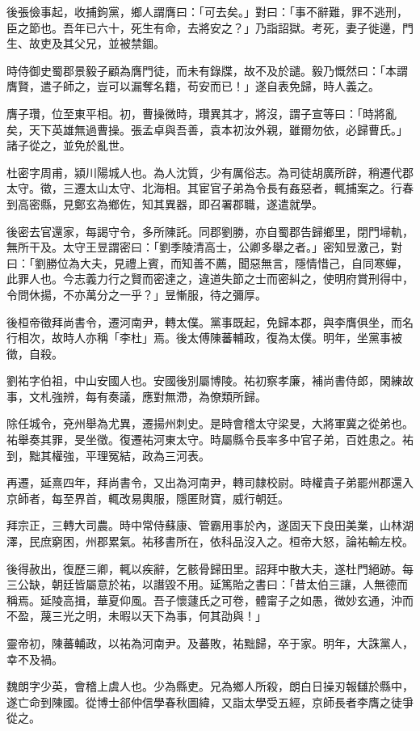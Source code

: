 \begin{pinyinscope}
後張儉事起，收捕鉤黨，鄉人謂膺曰：「可去矣。」對曰：「事不辭難，罪不逃刑，臣之節也。吾年已六十，死生有命，去將安之？」乃詣詔獄。考死，妻子徙邊，門生、故吏及其父兄，並被禁錮。

時侍御史蜀郡景毅子顧為膺門徒，而未有錄牒，故不及於譴。毅乃慨然曰：「本謂膺賢，遣子師之，豈可以漏奪名籍，苟安而已！」遂自表免歸，時人義之。

膺子瓚，位至東平相。初，曹操微時，瓚異其才，將沒，謂子宣等曰：「時將亂矣，天下英雄無過曹操。張孟卓與吾善，袁本初汝外親，雖爾勿依，必歸曹氏。」諸子從之，並免於亂世。

杜密字周甫，潁川陽城人也。為人沈質，少有厲俗志。為司徒胡廣所辟，稍遷代郡太守。徵，三遷太山太守、北海相。其宦官子弟為令長有姦惡者，輒捕案之。行春到高密縣，見鄭玄為鄉佐，知其異器，即召署郡職，遂遣就學。

後密去官還家，每謁守令，多所陳託。同郡劉勝，亦自蜀郡告歸鄉里，閉門埽軌，無所干及。太守王昱謂密曰：「劉季陵清高士，公卿多舉之者。」密知昱激己，對曰：「劉勝位為大夫，見禮上賓，而知善不薦，聞惡無言，隱情惜己，自同寒蟬，此罪人也。今志義力行之賢而密達之，違道失節之士而密糾之，使明府賞刑得中，令問休揚，不亦萬分之一乎？」昱慚服，待之彌厚。

後桓帝徵拜尚書令，遷河南尹，轉太僕。黨事既起，免歸本郡，與李膺俱坐，而名行相次，故時人亦稱「李杜」焉。後太傅陳蕃輔政，復為太僕。明年，坐黨事被徵，自殺。

劉祐字伯祖，中山安國人也。安國後別屬博陵。祐初察孝廉，補尚書侍郎，閑練故事，文札強辨，每有奏議，應對無滯，為僚類所歸。

除任城令，兗州舉為尤異，遷揚州刺史。是時會稽太守梁旻，大將軍冀之從弟也。祐舉奏其罪，旻坐徵。復遷祐河東太守。時屬縣令長率多中官子弟，百姓患之。祐到，黜其權強，平理冤結，政為三河表。

再遷，延熹四年，拜尚書令，又出為河南尹，轉司隸校尉。時權貴子弟罷州郡還入京師者，每至界首，輒改易輿服，隱匿財寶，威行朝廷。

拜宗正，三轉大司農。時中常侍蘇康、管霸用事於內，遂固天下良田美業，山林湖澤，民庶窮困，州郡累氣。祐移書所在，依科品沒入之。桓帝大怒，論祐輸左校。

後得赦出，復歷三卿，輒以疾辭，乞骸骨歸田里。詔拜中散大夫，遂杜門絕跡。每三公缺，朝廷皆屬意於祐，以譖毀不用。延篤貽之書曰：「昔太伯三讓，人無德而稱焉。延陵高揖，華夏仰風。吾子懷蘧氏之可卷，體甯子之如愚，微妙玄通，沖而不盈，蔑三光之明，未暇以天下為事，何其劭與！」

靈帝初，陳蕃輔政，以祐為河南尹。及蕃敗，祐黜歸，卒于家。明年，大誅黨人，幸不及禍。

魏朗字少英，會稽上虞人也。少為縣吏。兄為鄉人所殺，朗白日操刃報讎於縣中，遂亡命到陳國。從博士郤仲信學春秋圖緯，又詣太學受五經，京師長者李膺之徒爭從之。


\end{pinyinscope}
